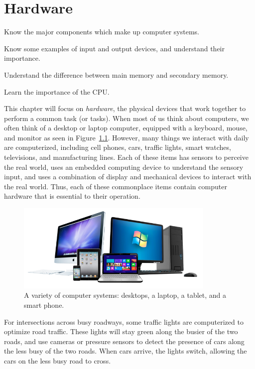 \chapter{Hardware}

\begin{goals}
\item Know the major components which make up computer systems.
\item Know some examples of input and output devices, and understand their importance.
\item Understand the difference between main memory and secondary memory.
\item Learn the importance of the CPU.
\end{goals}

This chapter will focus on \emph{hardware}, the physical devices that work together to perform a common task (or tasks).  When most of us think about computers, we often think of a desktop or laptop computer, equipped with a keyboard, mouse, and monitor as seen in Figure~\ref{fig:hardware:computers}. However, many things we interact with daily are computerized, including cell phones, cars, traffic lights, smart watches, televisions, and manufacturing lines. Each of these items has sensors to perceive the real world, uses an embedded computing device to understand the sensory input, and uses a combination of display and mechanical devices to interact with the real world. Thus, each of these commonplace items contain computer hardware that is essential to their operation.

\begin{figure}
	\centering
	\includegraphics[width=0.85\textwidth]{images/computer_system.png}
	\caption{A variety of computer systems: desktops, a laptop, a tablet, and a
    smart phone. }
	\label{fig:hardware:computers}
\end{figure}

\begin{example}\label{exmp:traffic_light}
  For intersections across busy roadways, some traffic lights are computerized to optimize road traffic. These lights will stay green along the busier of the two roads, and use cameras or pressure sensors to detect the presence of cars along the less busy of the two roads. When cars arrive, the lights switch, allowing the cars on the less busy road to cross.
\end{example}

